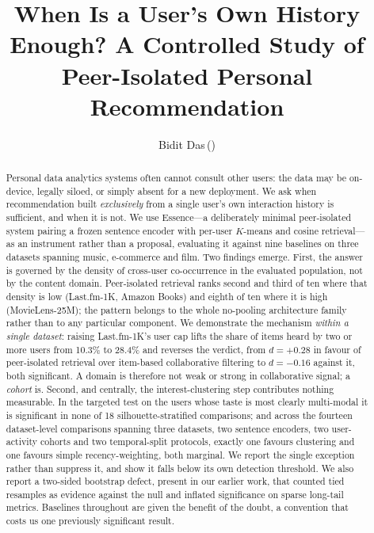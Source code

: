 \documentclass[runningheads]{llncs}
\begin{document}
\title{When Is a User's Own History Enough? A Controlled Study of
Peer-Isolated Personal Recommendation}

\author{Bidit Das\,(\Letter)}

\maketitle

\begin{abstract}
Personal data analytics systems often cannot consult other users: the data may be
on-device, legally siloed, or simply absent for a new deployment. We ask when
recommendation built \emph{exclusively} from a single user's own interaction history is
sufficient, and when it is not. We use Essence---a deliberately minimal peer-isolated
system pairing a frozen sentence encoder with per-user $K$-means and cosine
retrieval---as an instrument rather than a proposal, evaluating it against nine baselines
on three datasets spanning music, e-commerce and film.
Two findings emerge. First, the answer is governed by the density of cross-user
co-occurrence in the evaluated population, not by the content domain. Peer-isolated
retrieval ranks second and third of ten where that density is low (Last.fm-1K, Amazon
Books) and eighth of ten where it is high (MovieLens-25M); the pattern belongs to the
whole no-pooling architecture family rather than to any particular component. We
demonstrate the mechanism \emph{within a single dataset}: raising Last.fm-1K's user cap
lifts the share of items heard by two or more users from 10.3\% to 28.4\% and reverses the
verdict, from $d = +0.28$ in favour of peer-isolated retrieval over item-based
collaborative filtering to $d = -0.16$ against it, both significant. A domain is therefore
not weak or strong in collaborative signal; a \emph{cohort} is. Second, and centrally, the interest-clustering step contributes nothing
measurable. In the targeted test on the users whose taste is most clearly multi-modal it is
significant in none of 18 silhouette-stratified comparisons; and across the fourteen
dataset-level comparisons spanning three datasets, two sentence encoders, two user-activity
cohorts and two temporal-split protocols, exactly one favours clustering and one favours
simple recency-weighting, both marginal.
We report the single exception rather than suppress it, and show it falls below its own
detection threshold. We also report a two-sided bootstrap defect, present in our earlier
work, that counted tied resamples as evidence against the null and inflated significance
on sparse long-tail metrics. Baselines throughout are given the benefit of the doubt, a
convention that costs us one previously significant result.
\end{abstract}
\end{document}
